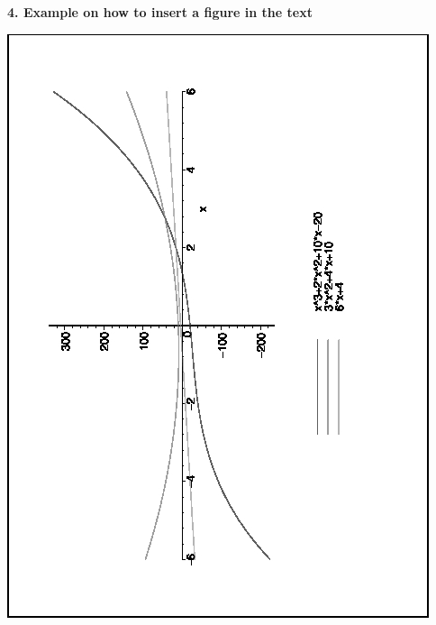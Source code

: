 \documentclass[12pt]{article}
\begin{document}
\newpage
\noindent \textbf{4. Example on how to insert a figure in the text}

\includegraphics[width=2.in]{plot1.jpg} 



\begin{center}
\end{center}
\end{document}
